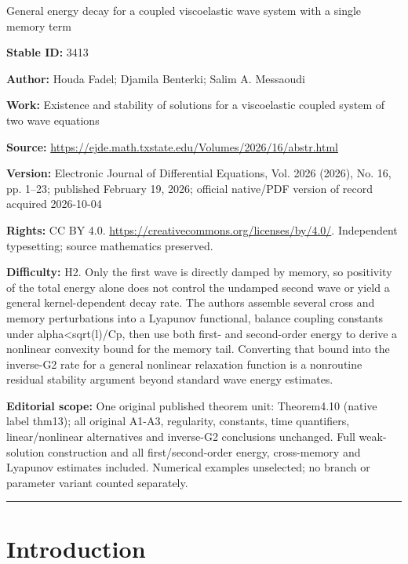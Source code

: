 \documentclass[11pt]{article}
\numberwithin{equation}{section}
\begin{document}
\begin{center}\Large General energy decay for a coupled viscoelastic wave system with a single memory term\end{center}
\noindent\textbf{Stable ID:} 3413\par
\noindent\textbf{Author:} Houda Fadel; Djamila Benterki; Salim A. Messaoudi\par
\noindent\textbf{Work:} Existence and stability of solutions for a viscoelastic coupled system of two wave equations\par
\noindent\textbf{Source:} \url{https://ejde.math.txstate.edu/Volumes/2026/16/abstr.html}\par
\noindent\textbf{Version:} Electronic Journal of Differential Equations, Vol. 2026 (2026), No. 16, pp. 1--23; published February 19, 2026; official native/PDF version of record acquired 2026-10-04\par
\noindent\textbf{Rights:} CC BY 4.0. \url{https://creativecommons.org/licenses/by/4.0/}. Independent typesetting; source mathematics preserved.\par
\noindent\textbf{Difficulty:} H2. Only the first wave is directly damped by memory, so positivity of the total energy alone does not control the undamped second wave or yield a general kernel-dependent decay rate. The authors assemble several cross and memory perturbations into a Lyapunov functional, balance coupling constants under alpha<sqrt(l)/Cp, then use both first- and second-order energy to derive a nonlinear convexity bound for the memory tail. Converting that bound into the inverse-G2 rate for a general nonlinear relaxation function is a nonroutine residual stability argument beyond standard wave energy estimates.\par
\noindent\textbf{Editorial scope:} One original published theorem unit: Theorem4.10 (native label thm13); all original A1-A3, regularity, constants, time quantifiers, linear/nonlinear alternatives and inverse-G2 conclusions unchanged. Full weak-solution construction and all first/second-order energy, cross-memory and Lyapunov estimates included. Numerical examples unselected; no branch or parameter variant counted separately.\par
\medskip\hrule\medskip
 \section{Introduction}
 
\end{document}
